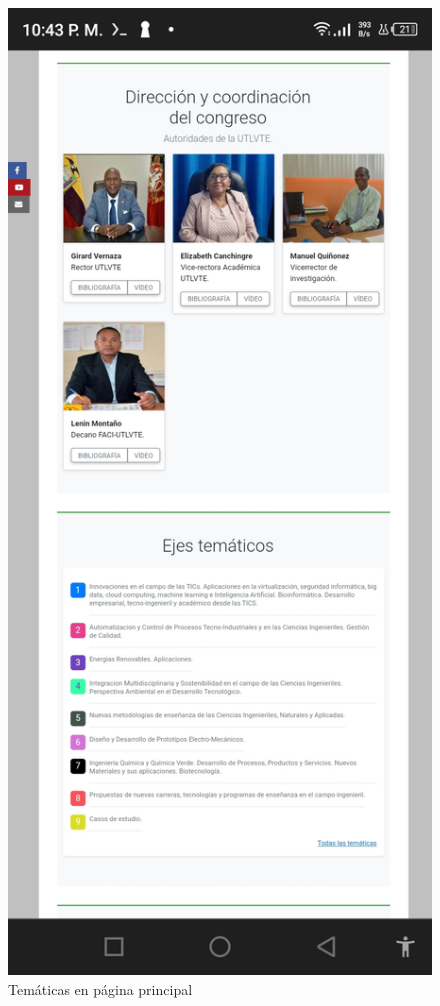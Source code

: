 \documentclass[a4paper,14px]{article}
\begin{document}
\hspace{0.5cm}
\begin{minipage}[H]{0.5\linewidth}
  \begin{figure}[H]
    \centering
    \includegraphics[scale=0.3]{index2.jpg}
    \caption{Temáticas en página principal}
    \label{fig:tematicas2}
  \end{figure}
\end{minipage}
\end{document}
